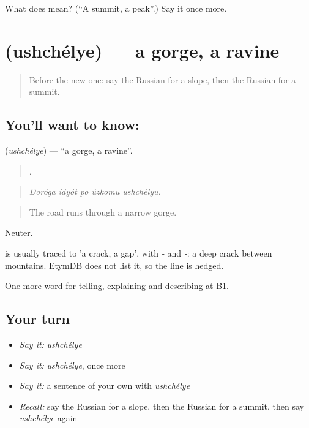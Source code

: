 \begin{tcolorbox}[breakable,colback=teal!4,colframe=teal!35!black,title={Before you move on}]
What does  mean? (\textquotedblleft{}A summit, a peak\textquotedblright{}.) Say it once more.
\end{tcolorbox}
\section[\texorpdfstring{\ru{ущелье} (ushchélye)}{ущелье (ushchélye)}]{ (ushchélye) — a gorge, a ravine}

\label{lesson:RU-C458-ushchelye}



\begin{quote}
Before the new one: say the Russian for a slope, then the Russian for a summit.
\end{quote}

\subsection*{You'll want to know: }
\textbf{} (\emph{ushchélye}) — \textquotedblleft{}a gorge, a ravine\textquotedblright{}.

\begin{quote}
    .
\end{quote}

\begin{quote}
\emph{Doróga idyót po úzkomu ushchélyu.}
\end{quote}

\begin{quote}
The road runs through a narrow gorge.
\end{quote}

Neuter.

\begin{cousinweb}
\emph{} is usually traced to \emph{} 'a crack, a gap', with \emph{-} and \emph{-}: a deep crack between mountains. EtymDB does not list it, so the line is hedged.
\end{cousinweb}

\begin{grammarlens}[title={What you've built}]
One more word for telling, explaining and describing at B1.
\end{grammarlens}

\subsection*{Your turn}
\begin{itemize}
\raggedright
  \item \emph{Say it:} \emph{ushchélye}
  \item \emph{Say it:} \emph{ushchélye}, once more
  \item \emph{Say it:} a sentence of your own with \emph{ushchélye}
  \item \emph{Recall:} say the Russian for a slope, then the Russian for a summit, then say \emph{ushchélye} again
\end{itemize}

